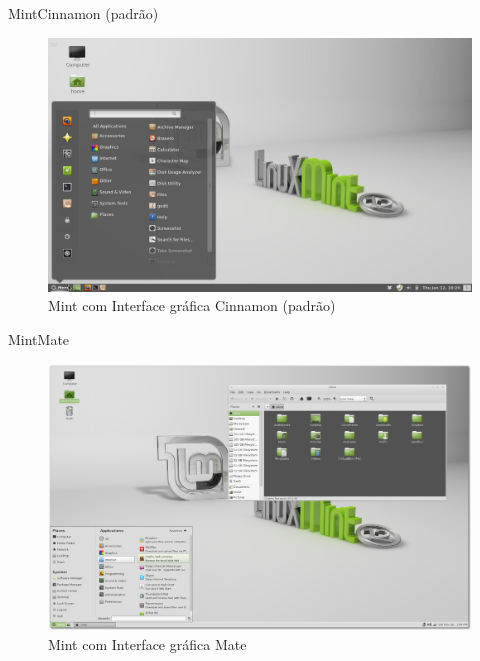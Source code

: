 \documentclass{beamer}
\begin{document}
\begin{frame}{Mint}{Cinnamon (padrão)}
 \begin{figure}[h!]
        \centering
        \includegraphics[scale=0.20]{MintCinnamon.jpg}
        \caption{Mint com Interface gráfica Cinnamon (padrão)}
        \label{fig:Comando ls}
    \end{figure}
\end{frame}

\begin{frame}{Mint}{Mate}
 \begin{figure}[h!]
        \centering
        \includegraphics[scale=0.12]{MintMate.png}
        \caption{Mint com Interface gráfica Mate}
        \label{fig:Comando ls}
    \end{figure}
\end{frame}
\end{document}
